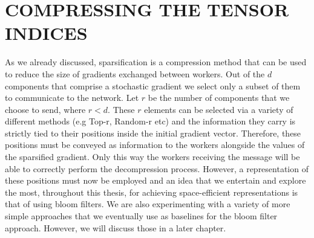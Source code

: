 \chapter{COMPRESSING THE TENSOR INDICES}
    
        As we already discussed, sparsification is a compression method that can be used to reduce the size of gradients exchanged between workers.
        Out of the $d$ components that comprise a stochastic gradient we select only a subset of them to communicate to the network. 
        Let $r$ be the number of components that we choose to send, where $r<d$. 
        These $r$ elements can be selected via a variety of different methods 
        (e.g Top-r, Random-r etc) and the information they carry is strictly tied to their positions inside the initial gradient vector.
        Therefore, these positions must be conveyed as information to the workers alongside the values of the sparsified gradient.
        Only this way the workers receiving the message will be able to correctly perform the decompression process.
        However, a representation of these positions must now be employed and an idea that we entertain and explore the most, throughout this thesis, for achieving space-efficient representations is that of using bloom filters.
        We are also experimenting with a variety of more simple approaches that we eventually use as baselines for the bloom filter approach. 
        However, we will discuss those in a later chapter.

